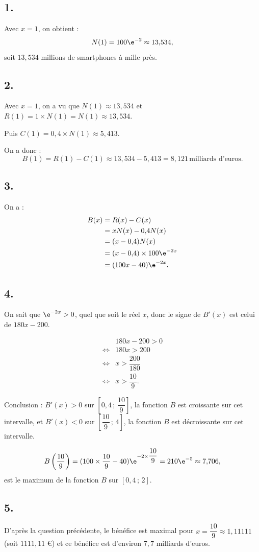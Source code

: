\subsection*{1.}

Avec \(x = 1\), on obtient :
\[
N(1) = 100\e^{-2} \approx 13{,}534,
\]
soit \(13{,}534\) millions de smartphones à mille près.

\subsection*{2.}

Avec \(x = 1\), on a vu que \(N(1) \approx 13{,}534\) et \(R(1) = 1 \times N(1) = N(1) \approx 13{,}534\).

Puis \(C(1) = 0{,}4 \times N(1) \approx 5{,}413\).

On a donc :
\[
B(1) = R(1) - C(1) \approx 13{,}534 - 5{,}413 = 8{,}121 \, \text{milliards d'euros}.
\]

\subsection*{3.}

On a :
\begin{align*}
B(x) &= R(x) - C(x) \\
&= xN(x) - 0{,}4N(x) \\
&= (x - 0{,}4)N(x) \\
&= (x - 0{,}4) \times 100\e^{-2x} \\
&= (100x - 40)\e^{-2x}.
\end{align*}

\subsection*{4.}

On sait que \(\e^{-2x} > 0\), quel que soit le réel \(x\), donc le signe de \(B'(x)\) est celui de \(180x - 200\).

\begin{align*}
&180x - 200 > 0 \\
\iff &180x > 200 \\
\iff &x > \dfrac{200}{180} \\
\iff &x > \dfrac{10}{9}.
\end{align*}

Conclusion : \(B'(x) > 0\) sur \(\left[0{,}4 \,;\, \dfrac{10}{9}\right]\), la fonction \(B\) est croissante sur cet intervalle, et \(B'(x) < 0\) sur \(\left[\dfrac{10}{9} \,;\, 4\right]\), la fonction \(B\) est décroissante sur cet intervalle.

\[
B\left(\dfrac{10}{9}\right) = (100 \times \dfrac{10}{9} - 40)\e^{-2 \times \dfrac{10}{9}} = 210\e^{-5} \approx 7{,}706,
\]
est le maximum de la fonction \(B\) sur \([0{,}4 \,;\, 2]\).

\subsection*{5.}

D'après la question précédente, le bénéfice est maximal pour \( x = \dfrac{10}{9} \approx 1{,}11111 \) (soit \(1111{,}11\) €) et ce bénéfice est d'environ \(7{,}7\) milliards d'euros.
